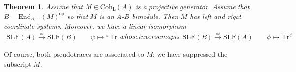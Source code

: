 \documentclass[11pt,b5paper,notitlepage]{article}
\theoremstyle{definition}
\theoremstyle{plain}
\newtheorem{thm}[df]{Theorem}
\newcommand{\Tr}{\mathrm{Tr}}
\newcommand{\End}{\mathrm{End}} %
\newcommand{\opp}{\mathrm{op}}
\newcommand{\Coh}{\mathrm{Coh}_{\mathrm L}}
\newcommand{\SLF}{\mathrm{SLF}}
\numberwithin{equation}{section}
\begin{document}
\begin{thm}\label{lb44}
Assume that $M\in\Coh(A)$ is a projective generator. Assume that $B=\End_{A,-}(M)^\opp$ so that $M$ is an $A$-$B$ bimodule. Then $M$ has left and right coordinate systems. Moreover, we have a linear isomorphism
\begin{subequations}\label{eq9}
\begin{align}\label{eq9a}
\SLF(A)\xrightarrow{\simeq}\SLF(B)\qquad \psi\mapsto {^\psi}\Tr
\end{align}
whose inverse map is
\begin{align}\label{eq9b}
\SLF(B)\xrightarrow{\simeq}\SLF(A)\qquad \phi\mapsto \Tr^\phi
\end{align}
\end{subequations}
\end{thm}

Of course, both pseudotraces are associated to $M$; we have suppressed the subscript $M$.
\end{document}
